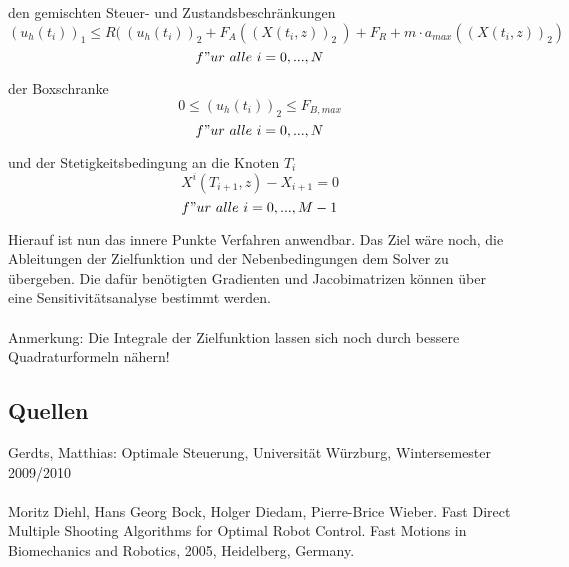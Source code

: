 \documentclass[12pt,a4paper]{article}
\theoremstyle{definition}
\theoremstyle{plain}
\begin{document}
	den gemischten Steuer- und Zustandsbeschränkungen
	\begin{equation}
	(u_{h}(t_{i}))_{1} \leq R(\ (u_{h}(t_{i}))_{2} + F_A((X(t_{i},z))_{2}\ ) + F_R + m\cdot a_{max}((X(t_{i},z))_{2}) 
	\end{equation}
	$$ f"ur \ alle \ i=0,...,N$$
	
	der Boxschranke
	\begin{equation}
	0\leq (u_{h}(t_{i}))_{2}\leq F_{B, max}
	\end{equation}
	$$ f"ur \ alle \ i=0,...,N$$
	
	und der Stetigkeitsbedingung an die Knoten $T_{i}$
	\begin{equation}
	X^{i}(T_{i+1},z)-X_{i+1}=0
	\end{equation}
	$$ f"ur \ alle \ i=0,..., M-1$$
	
	Hierauf ist nun das innere Punkte Verfahren anwendbar. Das Ziel wäre noch, die Ableitungen der Zielfunktion und der Nebenbedingungen dem Solver zu übergeben. Die dafür benötigten Gradienten und Jacobimatrizen können über eine Sensitivitätsanalyse bestimmt werden.\\
	\\
	Anmerkung: Die Integrale der Zielfunktion lassen sich noch durch bessere Quadraturformeln nähern!
	
	\subsection{Quellen}
	Gerdts, Matthias: Optimale Steuerung, Universität Würzburg, Wintersemester 2009/2010\\
	\\
	Moritz Diehl, Hans Georg Bock, Holger Diedam, Pierre-Brice Wieber. Fast Direct Multiple
	Shooting Algorithms for Optimal Robot Control. Fast Motions in Biomechanics and Robotics,
	2005, Heidelberg, Germany.
	
\end{document}
